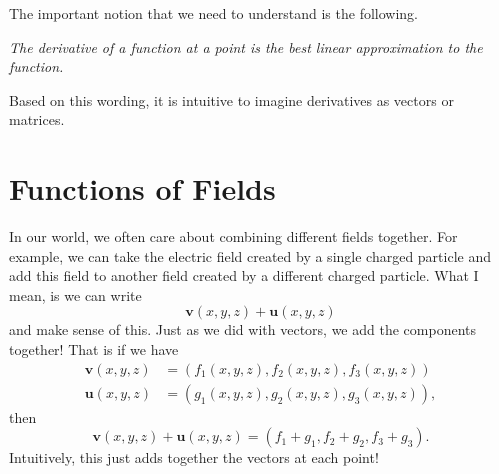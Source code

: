         \begin{remark}
        The important notion that we need to understand is the following.
        
        \emph{The derivative of a function at a point is the best linear approximation to the function.} 
        
        Based on this wording, it is intuitive to imagine derivatives as vectors or matrices.
        \end{remark}
        
        \section{Functions of Fields}
        In our world, we often care about combining different fields together.  For example, we can take the electric field created by a single charged particle and add this field to another field created by a different charged particle. What I mean, is we can write
        \[
        \mathbf{v}(x,y,z)+\mathbf{u}(x,y,z)
        \]
        and make sense of this.  Just as we did with vectors, we add the components together! That is if we have
        \begin{align*}
        \mathbf{v}(x,y,z)&=(f_1(x,y,z),f_2(x,y,z),f_3(x,y,z))\\ \mathbf{u}(x,y,z)&=(g_1(x,y,z),g_2(x,y,z),g_3(x,y,z)),
        \end{align*}
        then
        \[
        \mathbf{v}(x,y,z)+\mathbf{u}(x,y,z)=(f_1+g_1,f_2+g_2,f_3+g_3).
        \]
        Intuitively, this just adds together the vectors at each point!
        
